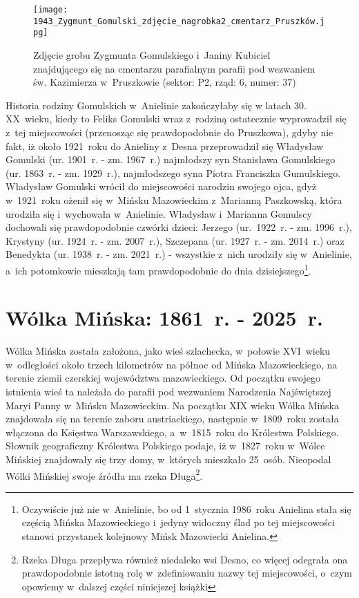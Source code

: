 \begin{figure}[!ht]
    \vspace*{0.5cm}
    \centering \texttt{[image: 
        1943\_Zygmunt\_Gomulski\_zdjęcie\_nagrobka2\_cmentarz\_Pruszków.jpg]}
    \captionsetup{format=hang}
    \caption{Zdjęcie grobu Zygmunta Gomulskiego i~Janiny Kubiciel 
    znajdującego się na cmentarzu parafialnym parafii pod wezwaniem św. 
    Kazimierza w~Pruszkowie (sektor: P2, rząd: 6, numer: 37)}
    \label{fig:zgomulski_1943}
\end{figure}

Historia rodziny Gomulskich w~Anielinie zakończyłaby się w latach 30. 
XX~wieku, kiedy to Feliks Gomulski wraz z~rodziną ostatecznie wyprowadził się 
z~tej miejscowości (przenosząc się prawdopodobnie do Pruszkowa), gdyby nie 
fakt, iż około 1921~roku do Anieliny z~Desna przeprowadził się Władysław 
Gomulski (ur. 1901~r. - zm. 1967~r.) najmłodszy syn Stanisława Gomulskiego 
(ur. 1863~r. - zm. 1929~r.), najmłodszego syna Piotra Franciszka Gumulskiego.
Władysław Gomulski wrócił do miejscowości narodzin swojego ojca, gdyż
w~1921~roku ożenił się w~Mińsku Mazowieckim z~Marianną Paszkowską, która 
urodziła się i~wychowała w~Anielinie. Władysław i~Marianna Gomulscy dochowali 
się prawdopodobnie czwórki dzieci: Jerzego (ur.~1922~r. - zm. 1996~r.),
Krystyny (ur. 1924~r. - zm. 2007~r.), Szczepana (ur. 1927~r. - zm. 2014~r.)
oraz Benedykta (ur. 1938~r. - zm. 2021~r.) - wszystkie z~nich urodziły się 
w~Anielinie, a~ich potomkowie mieszkają tam prawdopodobnie do dnia
dzisiejszego\footnote{Oczywiście już nie w~Anielinie, bo od 1~stycznia
1986~roku Anielina stała się częścią Mińska Mazowieckiego i~jedyny widoczny
ślad po tej miejscowości stanowi przystanek kolejnowy Mińsk Mazowiecki 
Anielina.}.



\section{Wólka Mińska: 1861~r. - 2025~r.}

Wólka Mińska została założona, jako wieś szlachecka, w~połowie XVI~wieku 
w~odległości około trzech kilometrów na północ od Mińska Mazowieckiego,
na terenie ziemii czerskiej województwa mazowieckiego. Od początku swojego 
istnienia wieś ta należała do parafii pod wezwaniem Narodzenia Najświętszej 
Maryi Panny w~Mińsku Mazowieckim. Na początku XIX wieku Wólka Mińska 
znajdowała się na terenie zaboru austriackiego, następnie w~1809~roku została 
włączona do Księstwa Warszawskiego, a~w~1815~roku do Królestwa Polskiego. 
Słownik geograficzny Królestwa Polskiego podaje, iż w~1827~roku w~Wólce 
Mińskiej znajdowały się trzy domy, w~których mieszkało 25~osób. Nieopodal 
Wólki Mińskiej swoje źródła ma rzeka Długa\footnote{Rzeka Długa przepływa
również niedaleko wsi Desno, co więcej odegrała ona prawdopodobnie 
istotną rolę w~zdefiniowaniu nazwy tej miejscowości, o~czym opowiemy 
w~dalszej części niniejszej książki}.

